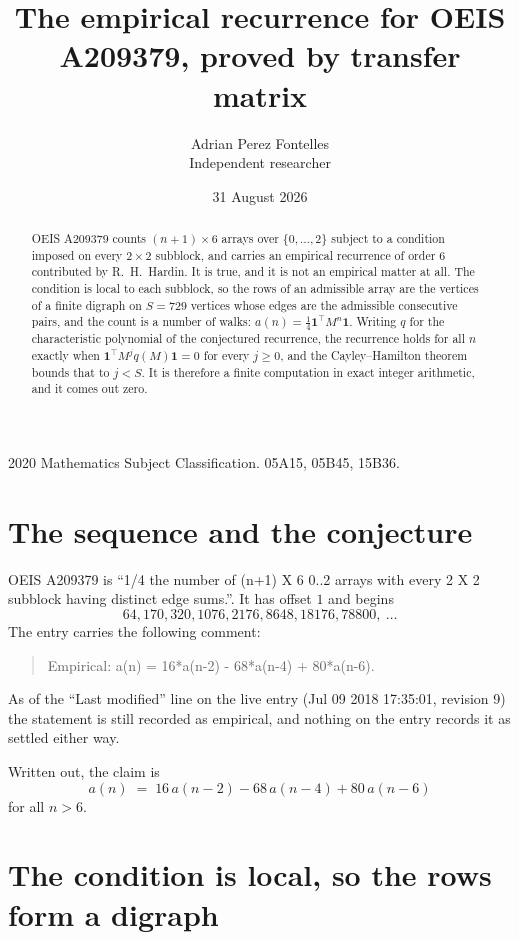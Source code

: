 \documentclass[11pt,a4paper]{article}
\title{The empirical recurrence for OEIS A209379, proved by transfer matrix}
\author{Adrian Perez Fontelles\\ \small Independent researcher}
\date{31 August 2026}
\theoremstyle{plain}
\theoremstyle{definition}
\begin{document}
\maketitle

\begin{abstract}
OEIS A209379 counts $(n+1)\times6$ arrays over $\{0,\dots,2\}$ subject to a condition imposed on
every $2\times2$ subblock, and carries an empirical recurrence of order $6$ contributed
by R.~H.~Hardin. It is true, and it is not an empirical matter at all. The condition is local
to each subblock, so the rows of an admissible array are the vertices of a finite digraph
on $S=729$ vertices whose edges are the admissible consecutive pairs, and the count is a
number of walks: $a(n)=\tfrac1{4}\mathbf{1}^{\!\top}M^{n}\mathbf{1}$. Writing $q$
for the characteristic polynomial of the conjectured recurrence, the recurrence holds for all
$n$ exactly when $\mathbf{1}^{\!\top}M^{j}q(M)\mathbf{1}=0$ for every $j\ge0$, and the
Cayley--Hamilton theorem bounds that to $j<S$. It is therefore a finite computation in exact
integer arithmetic, and it comes out zero.
\end{abstract}

\noindent\small 2020 Mathematics Subject Classification. 05A15, 05B45, 15B36.\normalsize

\section{The sequence and the conjecture}

OEIS A209379 is ``1/4 the number of (n+1) X 6 0..2 arrays with every 2 X 2 subblock having distinct edge sums.''. It has offset $1$ and begins
\[
64, 170, 320, 1076, 2176, 8648, 18176, 78800,\ \dots
\]
The entry carries the following comment:
\begin{quote}\small
Empirical: a(n) = 16*a(n-2) - 68*a(n-4) + 80*a(n-6).
\end{quote}
As of the ``Last modified'' line on the live entry (Jul 09 2018 17:35:01, revision 9) the statement is
still recorded as empirical, and nothing on the entry records it as settled either way.

Written out, the claim is
\begin{equation}\label{eq:conj}
a(n)\;=\;16\,a(n-2) - 68\,a(n-4) + 80\,a(n-6)
\end{equation}
for all $n>6$.

\section{The condition is local, so the rows form a digraph}
\end{document}

